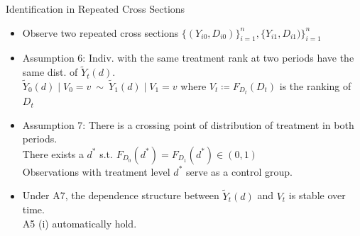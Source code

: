 \documentclass[aspectratio=1610, 9pt]{beamer}
\begin{document}
\begin{frame}{Identification in Repeated Cross Sections}
\label{slides:RC}
\begin{itemize}
\item Observe two repeated cross sections $\{(Y_{i0},D_{i0})\}_{i=1}^n,\{Y_{i1},D_{i1})\}_{i=1}^n$ 
       \vspace{0.15cm}

    \item Assumption 6: Indiv. with the same treatment rank at two periods have the same dist. of $\tilde{Y}_t(d)$.\\ 
    $\tilde{Y}_{0}(d)\mid V_{0}=v \ \sim \  \tilde{Y}_{1}(d)\mid V_{1}=v$
\quad where $V_t \coloneqq F_{D_t}(D_t)$ is the ranking of $D_t$
      \vspace{0.15cm}
    \item Assumption 7: There is a crossing point of distribution of treatment in both periods.  \\ 
    There exists a $d^{*}$ s.t. $F_{D_{0}}(d^{*})=F_{D_{1}}(d^{*})\in(0,1)$  \quad \hyperlink{ass:cross}{}\\
    Observations with treatment level $d^{*}$ serve as a control group.
       \vspace{0.15cm}
       \item Under A7, the dependence structure between $\tilde{Y}_t(d)$ and $V_t$ is stable over time.\\ A5 (i) automatically hold.
    
\end{itemize}

\end{frame}
\end{document}

